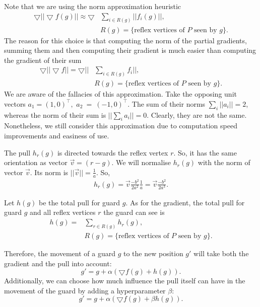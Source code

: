 Note that we are using the norm approximation heuristic 
\begin{align*}
    \bigtriangledown ||\bigtriangledown f(g)|| \approx \bigtriangledown &\sum_{i \in R(g)} ||f_i(g)||, \\
    &R(g) = \{\text{reflex vertices of } P \text{ seen by } g\}. 
\end{align*}
The reason for this choice is that computing the norm of the partial gradients, summing them and then computing their gradient is much easier than computing the gradient of their sum 
\begin{align*}
    \bigtriangledown ||\bigtriangledown f|| = \bigtriangledown ||&\sum_{i \in R(g)} f_i||, \\
    &R(g) = \{\text{reflex vertices of } P \text{ seen by } g\}.
\end{align*}
We are aware of the fallacies of this approximation. Take the opposing unit vectors $a_1 = (1, 0)^\intercal,$ $a_2~=~(-1, 0)^\intercal$. The sum of their norms $\sum_i ||a_i|| = 2$, whereas the norm of their sum is $||\sum_i a_i|| = 0$. Clearly, they are not the same. Nonetheless, we still consider this approximation due to computation speed improvements and easiness of use.

The pull $h_r(g)$ is directed towards the reflex vertex $r$. So, it has the same orientation as vector $\vec{v} = (r - g)$. We will normalise $h_r(g)$ with the norm of vector $\vec{v}$. Its norm is $||\vec{v}|| = \frac 1 a$. So, 
\begin{align}
    h_r(g) = \vec{v}\frac{-b^2}{2a^2}\frac 1 a = \vec{v}\frac{-b^2}{2a^3}. \label{eq:h}
\end{align}

Let $h(g)$ be the total pull for guard $g$. As for the gradient, the total pull for guard $g$ and all reflex vertices $r$ the guard can see is 
\begin{align*}
    h(g) = &\sum_{r \in R(g)} h_r(g), \\
    &R(g) = \{\text{reflex vertices of $P$ seen by $g$\}}.
\end{align*}

Therefore, the movement of a guard $g$ to the new position $g'$ will take both the gradient and the pull into account: $$g' = g + \alpha (\bigtriangledown f(g) + h(g)).$$ Additionally, we can choose how much influence the pull itself can have in the movement of the guard by adding a hyperparameter $\beta$: $$g' = g + \alpha (\bigtriangledown f(g) + \beta h(g)).$$

